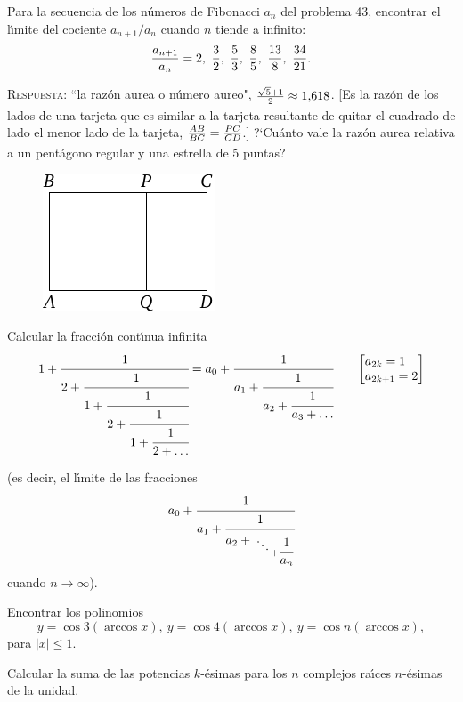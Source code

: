 \documentclass[12pt]{article}  %
\begin{document}
\bigskip
{} Para la secuencia de los n\'umeros de Fibonacci $a_n$ del problema 43, encontrar el l\'{\i}mite del cociente 
$a_{n+1}/a_n$ cuando $n$ tiende a infinito:\vspace{2\jot}
\[
\frac{a_{n+1}}{a_n}=2,\ \frac 32,\ \frac53, \ \frac85, \ \frac{13}8,
\ \frac{34}{21}.
\vspace{\jot}
\] 

\textsc{Respuesta:} ``la raz\'on aurea o n\'umero aureo",
$\frac{\sqrt{5}+1}{2\vphantom)} \approx 1{,}618$. [Es la raz\'on de los lados de una tarjeta que es similar a la tarjeta resultante de quitar el cuadrado de lado el menor lado de la tarjeta,
  $\frac{AB}{BC}=\frac{PC}{CD\vphantom)}$.] ?`Cu\'anto vale la raz\'on aurea relativa a un pent\'agono regular y una estrella de 5 puntas? 

\begin{figure}[h]
\centering
\includegraphics{taskbook-37}
\end{figure}

{} Calcular la fracci\'on cont\'{\i}nua infinita
\begin{align*}
1+\cfrac{1}{2+\cfrac{1}{1+\cfrac{1}{2+\cfrac{1}{1+\cfrac{1}{2+\ldots}}}}}=
a_0+\cfrac{1}{a_1+\cfrac{1}{a_2+\cfrac{1}{a_3+\dots}}} \qquad
\smash{
{\left[\begin{aligned} &a_{2k}=1 \\[-\jot] &a_{2k+1}
      =2 \end{aligned}\right]} }
\end{align*}

\medskip

\noindent (es decir, el l\'{\i}mite de las fracciones
$$
a_0+\cfrac{1}{a_1+\cfrac{1}{a_2+{\atop{\ddots \atop {}} + \cfrac{1}{a_n}}
} 
}
$$
cuando $n \to \infty$).


\bigskip
{} Encontrar los polinomios
\[
y=\cos 3 (\arccos x),\  y=\cos 4 (\arccos x),\ 
y=\cos n (\arccos x),
\] 
para $|x| \leqslant 1$. 


\bigskip
{} Calcular la suma de las potencias $k$-\'esimas para los $n$ complejos ra\'{\i}ces $n$-\'esimas de la unidad.  
 
\end{document}
